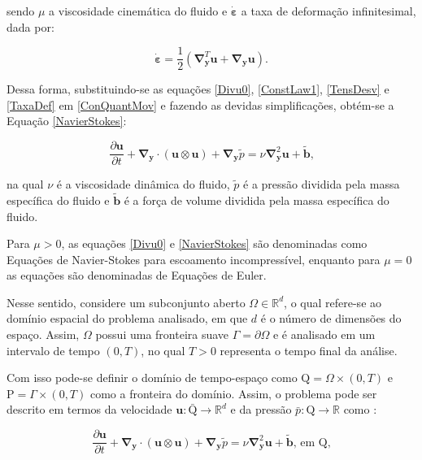 \documentclass[_ArquivoPrincipal.tex]{subfiles}
\begin{document}
\noindent sendo $\mu$ a viscosidade cinemática do fluido e $\dot{\mathbf{\varepsilon}}$ a taxa de deformação infinitesimal, dada por:

\begin{equation}
    \dot{\mathbf{\varepsilon}}=\frac{1}{2}\left(\mathbf{\nabla}^T_\mathbf{y}\mathbf{u}+\mathbf{\nabla}_\mathbf{y}\mathbf{u}\right)\text{.}
    \label{TaxaDef}
\end{equation}

Dessa forma, substituindo-se as equações \ref{Divu0}, \ref{ConstLaw1}, \ref{TensDesv} e \ref{TaxaDef} em \ref{ConQuantMov} e fazendo as devidas simplificações, obtém-se a Equação \ref{NavierStokes}:

\begin{equation}
    \frac{\partial\mathbf{u}}{\partial t}+\mathbf{\nabla}_\mathbf{y}\cdot(\mathbf{u}\otimes\mathbf{u})+\mathbf{\nabla}_\mathbf{y}\tilde{p}=\nu\mathbf{\nabla}^2_\mathbf{y}\mathbf{u}+\tilde{\mathbf{b}}\text{,}
    \label{NavierStokes}
\end{equation}

\noindent na qual $\nu$ é a viscosidade dinâmica do fluido, $\tilde{p}$ é a pressão dividida pela massa específica do fluido e $\tilde{\mathbf{b}}$ é a força de volume dividida pela massa específica do fluido.

Para $\mu>0$, as equações \ref{Divu0} e \ref{NavierStokes} são denominadas como Equações de Navier-Stokes para escoamento incompressível, enquanto para $\mu=0$ as equações são denominadas de Equações de Euler.

Nesse sentido, considere um subconjunto aberto $\Omega\in\mathbb{R}^d$, o qual refere-se ao domínio espacial do problema analisado, em que $d$ é o número de dimensões do espaço. Assim, $\Omega$ possui uma fronteira suave $\Gamma=\partial\Omega$ e é analisado em um intervalo de tempo $(0,T)$, no qual $T>0$ representa o tempo final da análise.

Com isso pode-se definir o domínio de tempo-espaço como $\mathrm{Q}=\Omega\times(0,T)$ e $\mathrm{P}=\Gamma\times(0,T)$ como a fronteira do domínio. Assim, o problema pode ser descrito em termos da velocidade $\mathbf{u}:\bar{\mathrm{Q}}\to\mathbb{R}^d$ e da pressão $\bar{p}:\mathrm{Q}\to\mathbb{R}$ como \cite{hughes2000large}:

\begin{equation}
    \frac{\partial\mathbf{u}}{\partial t}+\mathbf{\nabla}_\mathbf{y}\cdot(\mathbf{u}\otimes\mathbf{u})+\mathbf{\nabla}_\mathbf{y}\tilde{p}=\nu\mathbf{\nabla}^2_\mathbf{y}\mathbf{u}+\tilde{\mathbf{b}}\text{, em }\mathrm{Q}\text{,}
    \label{Sist1}
\end{equation}
\end{document}
